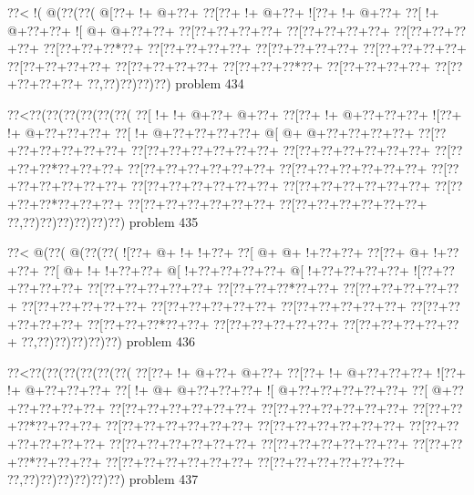 \vbox{\vbox{\goo
\0??<\- !(\- @(\0??(\0??(
\- @[\0??+\- !+\- @+\0??+
\0??[\0??+\- !+\- @+\0??+
\- ![\0??+\- !+\- @+\0??+
\0??[\- !+\- @+\0??+\0??+
\- ![\- @+\- @+\0??+\0??+
\0??[\0??+\0??+\0??+\0??+
\0??[\0??+\0??+\0??+\0??+
\0??[\0??+\0??+\0??+\0??+
\0??[\0??+\0??+\0??*\0??+
\0??[\0??+\0??+\0??+\0??+
\0??[\0??+\0??+\0??+\0??+
\0??[\0??+\0??+\0??+\0??+
\0??[\0??+\0??+\0??+\0??+
\0??[\0??+\0??+\0??+\0??+
\0??[\0??+\0??+\0??*\0??+
\0??[\0??+\0??+\0??+\0??+
\0??[\0??+\0??+\0??+\0??+
\0??,\0??)\0??)\0??)\0??)
}
\hfil problem 434\hfil\break
}

\vbox{\vbox{\goo
\0??<\0??(\0??(\0??(\0??(\0??(\0??(
\0??[\- !+\- !+\- @+\0??+\- @+\0??+
\0??[\0??+\- !+\- @+\0??+\0??+\0??+
\- ![\0??+\- !+\- @+\0??+\0??+\0??+
\0??[\- !+\- @+\0??+\0??+\0??+\0??+
\- @[\- @+\- @+\0??+\0??+\0??+\0??+
\0??[\0??+\0??+\0??+\0??+\0??+\0??+
\0??[\0??+\0??+\0??+\0??+\0??+\0??+
\0??[\0??+\0??+\0??+\0??+\0??+\0??+
\0??[\0??+\0??+\0??*\0??+\0??+\0??+
\0??[\0??+\0??+\0??+\0??+\0??+\0??+
\0??[\0??+\0??+\0??+\0??+\0??+\0??+
\0??[\0??+\0??+\0??+\0??+\0??+\0??+
\0??[\0??+\0??+\0??+\0??+\0??+\0??+
\0??[\0??+\0??+\0??+\0??+\0??+\0??+
\0??[\0??+\0??+\0??*\0??+\0??+\0??+
\0??[\0??+\0??+\0??+\0??+\0??+\0??+
\0??[\0??+\0??+\0??+\0??+\0??+\0??+
\0??,\0??)\0??)\0??)\0??)\0??)\0??)
}
\hfil problem 435\hfil\break
}

\vbox{\vbox{\goo
\0??<\- @(\0??(\- @(\0??(\0??(
\- ![\0??+\- @+\- !+\- !+\0??+
\0??[\- @+\- @+\- !+\0??+\0??+
\0??[\0??+\- @+\- !+\0??+\0??+
\0??[\- @+\- !+\- !+\0??+\0??+
\- @[\- !+\0??+\0??+\0??+\0??+
\- @[\- !+\0??+\0??+\0??+\0??+
\- ![\0??+\0??+\0??+\0??+\0??+
\0??[\0??+\0??+\0??+\0??+\0??+
\0??[\0??+\0??+\0??*\0??+\0??+
\0??[\0??+\0??+\0??+\0??+\0??+
\0??[\0??+\0??+\0??+\0??+\0??+
\0??[\0??+\0??+\0??+\0??+\0??+
\0??[\0??+\0??+\0??+\0??+\0??+
\0??[\0??+\0??+\0??+\0??+\0??+
\0??[\0??+\0??+\0??*\0??+\0??+
\0??[\0??+\0??+\0??+\0??+\0??+
\0??[\0??+\0??+\0??+\0??+\0??+
\0??,\0??)\0??)\0??)\0??)\0??)
}
\hfil problem 436\hfil\break
}

\vbox{\vbox{\goo
\0??<\0??(\0??(\0??(\0??(\0??(\0??(
\0??[\0??+\- !+\- @+\0??+\- @+\0??+
\0??[\0??+\- !+\- @+\0??+\0??+\0??+
\- ![\0??+\- !+\- @+\0??+\0??+\0??+
\0??[\- !+\- @+\- @+\0??+\0??+\0??+
\- ![\- @+\0??+\0??+\0??+\0??+\0??+
\0??[\- @+\0??+\0??+\0??+\0??+\0??+
\0??[\0??+\0??+\0??+\0??+\0??+\0??+
\0??[\0??+\0??+\0??+\0??+\0??+\0??+
\0??[\0??+\0??+\0??*\0??+\0??+\0??+
\0??[\0??+\0??+\0??+\0??+\0??+\0??+
\0??[\0??+\0??+\0??+\0??+\0??+\0??+
\0??[\0??+\0??+\0??+\0??+\0??+\0??+
\0??[\0??+\0??+\0??+\0??+\0??+\0??+
\0??[\0??+\0??+\0??+\0??+\0??+\0??+
\0??[\0??+\0??+\0??*\0??+\0??+\0??+
\0??[\0??+\0??+\0??+\0??+\0??+\0??+
\0??[\0??+\0??+\0??+\0??+\0??+\0??+
\0??,\0??)\0??)\0??)\0??)\0??)\0??)
}
\hfil problem 437\hfil\break
}

